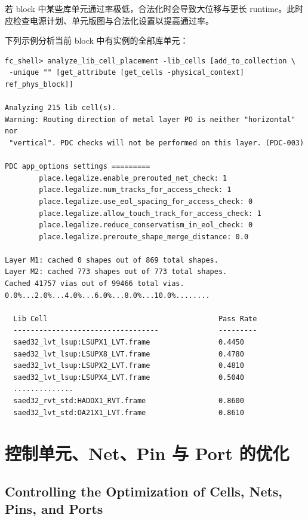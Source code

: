 若 block 中某些库单元通过率极低，合法化时会导致大位移与更长 runtime。此时应检查电源计划、单元版图与合法化设置以提高通过率。

下列示例分析当前 block 中有实例的全部库单元：
\begin{lstlisting}
fc_shell> analyze_lib_cell_placement -lib_cells [add_to_collection \
 -unique "" [get_attribute [get_cells -physical_context] ref_phys_block]]

Analyzing 215 lib cell(s).
Warning: Routing direction of metal layer PO is neither "horizontal" nor
 "vertical". PDC checks will not be performed on this layer. (PDC-003)

PDC app_options settings =========
        place.legalize.enable_prerouted_net_check: 1
        place.legalize.num_tracks_for_access_check: 1
        place.legalize.use_eol_spacing_for_access_check: 0
        place.legalize.allow_touch_track_for_access_check: 1
        place.legalize.reduce_conservatism_in_eol_check: 0
        place.legalize.preroute_shape_merge_distance: 0.0

Layer M1: cached 0 shapes out of 869 total shapes.
Layer M2: cached 773 shapes out of 773 total shapes.
Cached 41757 vias out of 99466 total vias.
0.0%...2.0%...4.0%...6.0%...8.0%...10.0%........

  Lib Cell                                        Pass Rate
  ----------------------------------              ---------
  saed32_lvt_lsup:LSUPX1_LVT.frame                0.4450
  saed32_lvt_lsup:LSUPX8_LVT.frame                0.4780
  saed32_lvt_lsup:LSUPX2_LVT.frame                0.4810
  saed32_lvt_lsup:LSUPX4_LVT.frame                0.5040
  ..............
  saed32_rvt_std:HADDX1_RVT.frame                 0.8600
  saed32_lvt_std:OA21X1_LVT.frame                 0.8610
\end{lstlisting}

\section{控制单元、Net、Pin 与 Port 的优化}
\subsection*{Controlling the Optimization of Cells, Nets, Pins, and Ports}

